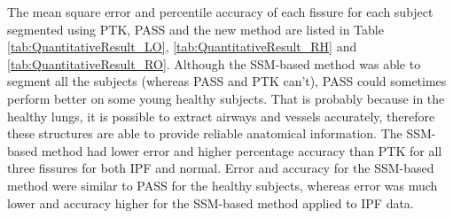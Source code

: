 {The mean square error and percentile accuracy of each fissure for each subject segmented using PTK, PASS and the new method are listed in Table \ref{tab:QuantitativeResult_LO}, \ref{tab:QuantitativeResult_RH} and \ref{tab:QuantitativeResult_RO}. Although the SSM-based method was able to segment all the subjects (whereas PASS and PTK can't), PASS could sometimes perform better on some young healthy subjects. That is probably because in the healthy lungs, it is possible to extract airways and vessels accurately, therefore these structures are able to provide reliable anatomical information. The SSM-based method had lower error and higher percentage accuracy than PTK for all three fissures for both IPF and normal. Error and accuracy for the SSM-based method were similar to PASS for the healthy subjects, whereas error was much lower and accuracy higher for the SSM-based method applied to IPF data.

}
